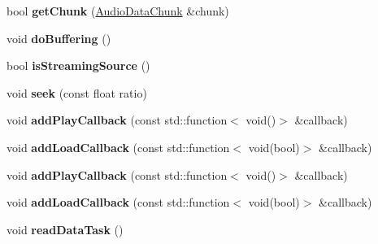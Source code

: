 \begin{DoxyCompactItemize}
\mbox{\label{classexperimental_1_1AudioCache_ae96642c4be10a8ce7c890d2990e79ccf}} 
bool {\bfseries get\+Chunk} (\hyperlink{structexperimental_1_1AudioDataChunk}{Audio\+Data\+Chunk} \&chunk)
\item 
\mbox{\label{classexperimental_1_1AudioCache_a712d7c2aa4785d77a9c331ad1c906c00}} 
void {\bfseries do\+Buffering} ()
\item 
\mbox{\label{classexperimental_1_1AudioCache_a8e7c50cef340e4bcd51879d7eeca44cf}} 
bool {\bfseries is\+Streaming\+Source} ()
\item 
\mbox{\label{classexperimental_1_1AudioCache_ab82d938e32cbf32ea6cebe6631f7b8a2}} 
void {\bfseries seek} (const float ratio)
\item 
\mbox{\label{classexperimental_1_1AudioCache_afb4446ca6e6ab9864d447f28f6ca950b}} 
void {\bfseries add\+Play\+Callback} (const std\+::function$<$ void()$>$ \&callback)
\item 
\mbox{\label{classexperimental_1_1AudioCache_a432859e958df2cebc91c77961f4fa5ea}} 
void {\bfseries add\+Load\+Callback} (const std\+::function$<$ void(bool)$>$ \&callback)
\item 
\mbox{\label{classexperimental_1_1AudioCache_afb4446ca6e6ab9864d447f28f6ca950b}} 
void {\bfseries add\+Play\+Callback} (const std\+::function$<$ void()$>$ \&callback)
\item 
\mbox{\label{classexperimental_1_1AudioCache_a432859e958df2cebc91c77961f4fa5ea}} 
void {\bfseries add\+Load\+Callback} (const std\+::function$<$ void(bool)$>$ \&callback)
\item 
\mbox{\label{classexperimental_1_1AudioCache_a9fbb7ec03161fd6c4e7b550d412882fb}} 
void {\bfseries read\+Data\+Task} ()
\item 
\mbox{\label{classexperimental_1_1AudioCache_af2c456e2aeea4608038f52b6617679c2}} 

\end{DoxyCompactItemize}
